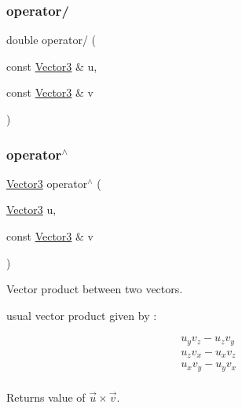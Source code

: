 \mbox{\label{class_vector3_a87668fe6d96f1826fb2721883d194ad3}} 
\subsubsection{\texorpdfstring{operator/}{operator/}\hspace{0.1cm}{\footnotesize\ttfamily [2/2]}}
{\footnotesize\ttfamily double operator/ (\begin{DoxyParamCaption}\item[{const \mbox{\hyperlink{class_vector3}{Vector3}} \&}]{u,  }\item[{const \mbox{\hyperlink{class_vector3}{Vector3}} \&}]{v }\end{DoxyParamCaption})\hspace{0.3cm}{\ttfamily [friend]}}

\mbox{\label{class_vector3_adb4922062355e087babc81e8d5b7c05f}} 
\subsubsection{\texorpdfstring{operator$^\wedge$}{operator^}}
{\footnotesize\ttfamily \mbox{\hyperlink{class_vector3}{Vector3}} operator$^\wedge$ (\begin{DoxyParamCaption}\item[{\mbox{\hyperlink{class_vector3}{Vector3}}}]{u,  }\item[{const \mbox{\hyperlink{class_vector3}{Vector3}} \&}]{v }\end{DoxyParamCaption})\hspace{0.3cm}{\ttfamily [friend]}}



Vector product between two vectors. 

usual vector product given by \+:

\[ \begin{align*} & u_y v_z - u_z v_y \\ & u_z v_x - u_x v_z \\ & u_x v_y - u_y v_x \\ \end{align*} \]

\begin{DoxyReturn}{Returns}
value of $ \vec{u} \times \vec{v} $. 
\end{DoxyReturn}
\mbox{\label{class_vector3_ab7427dc980f710e550fb4de32f0dfcbb}} 
